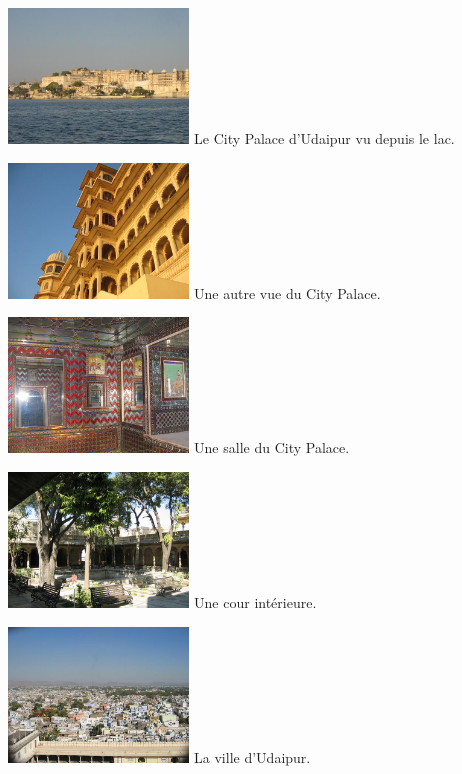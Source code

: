 \begin{multicols}{2}
\hspace*{-0.65cm}
\includegraphics[width=4.8cm]{articles/Il-commence-a-faire-chaud/palacelac.jpg}
Le City Palace d'Udaipur vu depuis le lac.

\hspace*{-0.65cm}
\includegraphics[width=4.8cm]{articles/Il-commence-a-faire-chaud/citylac2.jpg}
Une autre vue du City Palace.

\hspace*{-0.65cm}
\includegraphics[width=4.8cm]{articles/Il-commence-a-faire-chaud/citysalle.jpg}
Une salle du City Palace.

\hspace*{-0.65cm}
\includegraphics[width=4.8cm]{articles/Il-commence-a-faire-chaud/citycours.jpg}
Une cour intérieure.

\hspace*{-0.65cm}
\includegraphics[width=4.8cm]{articles/Il-commence-a-faire-chaud/udaipur.jpg}
La ville d'Udaipur.


\end{multicols}
